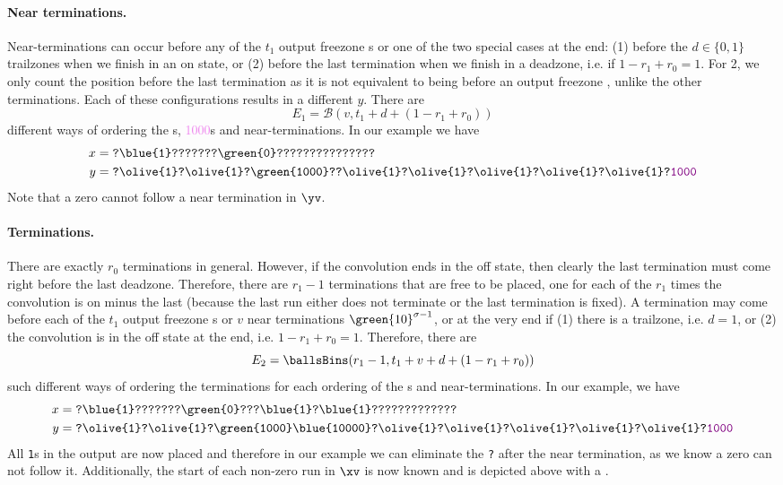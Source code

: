 \paragraph{Near terminations.} Near-terminations can occur before any of the $t_1$ output freezone \texttt{}s or one of the two special cases at the end: (1) before the $d \in \{0,1\}$ trailzones when we finish in an on state, or (2) before the last termination when we finish in a deadzone, i.e. if $1-r_1+r_0=1$. For 2, we only count the position before the last termination as it is not equivalent to being before an output freezone , unlike the other terminations. Each of these configurations results in a different $y$. There are
$$
E_1=\mathcal{B}(v,t_1+d+(1-r_1+r_0))
$$
different ways of ordering the s, \textcolor{violet}{1000}s and near-terminations. In our example we have
\begin{align*}
  x&=\texttt{?\blue{1}???????\green{0}???????????????}\\
  y&=\texttt{?\olive{1}?\olive{1}?\green{1000}??\olive{1}?\olive{1}?\olive{1}?\olive{1}?\olive{1}?\textcolor{violet}{1000}}
\end{align*}
Note that a zero cannot follow a near termination in $\yv$.

\paragraph{Terminations.} There are exactly $r_0$ terminations in general. However, if the convolution ends in the off state, then clearly the last termination must come right before the last deadzone. Therefore, there are $r_1-1$ terminations that are free to be placed, one for each of the $r_1$ times the convolution is on minus the last (because the last run either does not terminate or the last termination is fixed).
A termination may come before each of the $t_1$ output freezone s or $v$ near terminations $\green{10}^{\sigma-1}$, or at the very end if (1) there is a trailzone, i.e. $d=1$, or (2) the convolution is in the off state at the end, i.e. $1-r_1+r_0=1$. Therefore, there are
$$
E_2=\ballsBins(r_1-1, t_1+v+d+(1-r_1+r_0))
$$
such different ways of ordering the terminations for each ordering of the \texttt{}s and near-terminations. In our example, we have
\begin{align*}
  x&=\texttt{?\blue{1}???????\green{0}???\blue{1}?\blue{1}?????????????}\\
  y&=\texttt{?\olive{1}?\olive{1}?\green{1000}\blue{10000}?\olive{1}?\olive{1}?\olive{1}?\olive{1}?\olive{1}?\textcolor{violet}{1000}}
\end{align*}
All \texttt{1}s in the output are now placed and therefore in our example we can eliminate the \texttt{?} after the near termination, as we know a zero can not follow it. Additionally, the start of each non-zero run in $\xv$ is now known and is depicted above with a .

